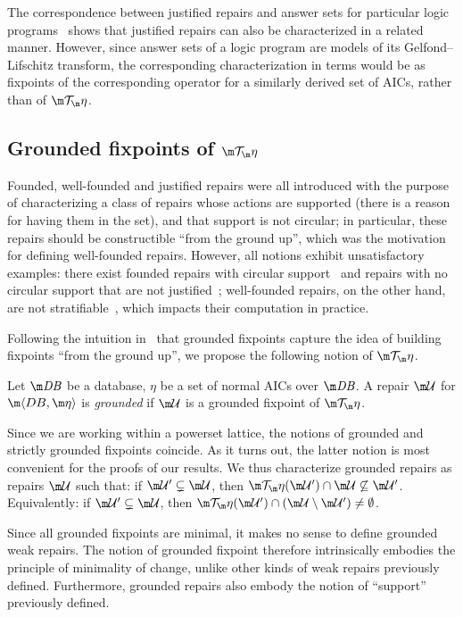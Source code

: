 The correspondence between justified repairs and answer sets for particular logic programs~\cite{Caroprese2011} shows that justified repairs can also be characterized in a related manner.
However, since answer sets of a logic program are models of its Gelfond--Lifschitz transform, the corresponding characterization in terms would be as fixpoints of the corresponding operator for a similarly derived set of AICs, rather than of $\Op$.

\subsection{Grounded fixpoints of $\Op$}

Founded, well-founded and justified repairs were all introduced with the purpose of characterizing a class of repairs whose actions are supported (there is a reason for having them in the set), and that support is not circular; in particular, these repairs should be constructible ``from the ground up'', which was the motivation for defining well-founded repairs.
However, all notions exhibit unsatisfactory examples: there exist founded repairs with circular support~\cite{Caroprese2011} and repairs with no circular support that are not justified~\cite{CEGN13}; well-founded repairs, on the other hand, are not stratifiable~\cite{lcf:14}, which impacts their computation in practice.

Following the intuition in~ that grounded fixpoints capture the idea of building fixpoints ``from the ground up'', we propose the following notion of $\Op$.

\begin{definition}
  Let $\db$ be a database, $\eta$ be a set of normal AICs over $\db$.
  A repair $\UU$ for $\fulldb$ is \emph{grounded} if $\UU$ is a grounded fixpoint of $\Op$.
\end{definition}

Since we are working within a powerset lattice, the notions of grounded and strictly grounded fixpoints coincide.
As it turns out, the latter notion is most convenient for the proofs of our results.
We thus characterize grounded repairs as repairs $\UU$ such that: if $\UU'\subsetneq\UU$, then $\Op(\UU')\cap\UU\not\subseteq\UU'$.
Equivalently: if $\UU'\subsetneq\UU$, then $\Op(\UU')\cap(\UU\setminus\UU')\neq\emptyset$.

Since all grounded fixpoints are minimal, it makes no sense to define grounded weak repairs.
The notion of grounded fixpoint therefore intrinsically embodies the principle of minimality of change, unlike other kinds of weak repairs previously defined.
Furthermore, grounded repairs also embody the notion of ``support'' previously defined.

